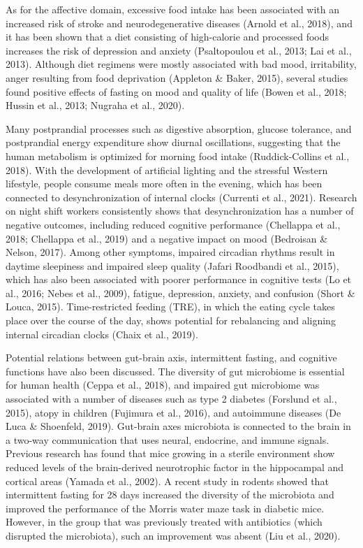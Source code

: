 \documentclass[authordate, empirical]{jote-new-article}
\begin{document}
As for the affective domain, excessive food intake has been associated with an increased risk of stroke and neurodegenerative diseases (Arnold et al., 2018), and it has been shown that a diet consisting of high-calorie and processed foods increases the risk of depression and anxiety (Psaltopoulou et al., 2013; Lai et al., 2013). Although diet regimens were mostly associated with bad mood, irritability, anger resulting from food deprivation (Appleton \& Baker, 2015), several studies found positive effects of fasting on mood and quality of life (Bowen et al., 2018; Hussin et al., 2013; Nugraha et al., 2020).



Many postprandial processes such as digestive absorption, glucose tolerance, and postprandial energy expenditure show diurnal oscillations, suggesting that the human metabolism is optimized for morning food intake (Ruddick-Collins et al., 2018). With the development of artificial lighting and the stressful Western lifestyle, people consume meals more often in the evening, which has been connected to desynchronization of internal clocks (Currenti et al., 2021). Research on night shift workers consistently shows that desynchronization has a number of negative outcomes, including reduced cognitive performance (Chellappa et al., 2018; Chellappa et al., 2019) and a negative impact on mood (Bedroisan \& Nelson, 2017). Among other symptoms, impaired circadian rhythms result in daytime sleepiness and impaired sleep quality (Jafari Roodbandi et al., 2015), which has also been associated with poorer performance in cognitive tests (Lo et al., 2016; Nebes et al., 2009), fatigue, depression, anxiety, and confusion (Short \& Louca, 2015). Time-restricted feeding (TRE), in which the eating cycle takes place over the course of the day, shows potential for rebalancing and aligning internal circadian clocks (Chaix et al., 2019).



Potential relations between gut-brain axis, intermittent fasting, and cognitive functions have also been discussed. The diversity of gut microbiome is essential for human health (Ceppa et al., 2018), and impaired gut microbiome was associated with a number of diseases such as type 2 diabetes (Forslund et al., 2015), atopy in children (Fujimura et al., 2016), and autoimmune diseases (De Luca \& Shoenfeld, 2019). Gut-brain axes microbiota is connected to the brain in a two-way communication that uses neural, endocrine, and immune signals. Previous research has found that mice growing in a sterile environment show reduced levels of the brain-derived neurotrophic factor in the hippocampal and cortical areas (Yamada et al., 2002). A recent study in rodents showed that intermittent fasting for 28 days increased the diversity of the microbiota and improved the performance of the Morris water maze task in diabetic mice. However, in the group that was previously treated with antibiotics (which disrupted the microbiota), such an improvement was absent (Liu et al., 2020).
\end{document}
